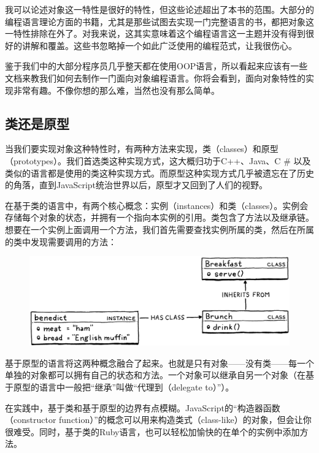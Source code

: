\documentclass[cn,10pt,math=newtx,citestyle=gb7714-2015,bibstyle=gb7714-2015]{elegantbook}
\begin{document}
我可以论述对象这一特性是很好的特性，但这些论述超出了本书的范围。大部分的编程语言理论方面的书籍，尤其是那些试图去实现一门完整语言的书，都把对象这一特性排除在外了。对我来说，这其实意味着这个编程语言这一主题并没有得到很好的讲解和覆盖。这些书忽略掉一个如此广泛使用的编程范式，让我很伤心。

鉴于我们中的大部分程序员几乎整天都在使用OOP语言，所以看起来应该有一些文档来教我们如何去制作一门面向对象编程语言。你将会看到，面向对象特性的实现非常有趣。不像你想的那么难，当然也没有那么简单。

\subsection{类还是原型}

当我们要实现对象这种特性时，有两种方法来实现，类（classes）和原型（prototypes）。我们首选类这种实现方式，这大概归功于C++、Java、C \# 以及类似的语言都是使用的类这种实现方式。而原型这种实现方式几乎被遗忘在了历史的角落，直到JavaScript统治世界以后，原型才又回到了人们的视野。

在基于类的语言中，有两个核心概念：实例（instances）和类（classes）。实例会存储每个对象的状态，并拥有一个指向本实例的引用。类包含了方法以及继承链。想要在一个实例上面调用一个方法，我们首先需要查找实例所属的类，然后在所属的类中发现需要调用的方法：

\begin{figure}[h]
\centering
\includegraphics[width=\textwidth]{./image/the-lox-language/class-lookup.png}
\end{figure}

基于原型的语言将这两种概念融合了起来。也就是只有对象——没有类——每一个单独的对象都可以拥有自己的状态和方法。一个对象可以继承自另一个对象（在基于原型的语言中一般把“继承”叫做“代理到（delegate to）”）。

\begin{tcolorbox}
在实践中，基于类和基于原型的边界有点模糊。JavaScript的“构造器函数（constructor function）”的概念可以用来构造类式（class-like）的对象，但会让你很难受。同时，基于类的Ruby语言，也可以轻松加愉快的在单个的实例中添加方法。
\end{tcolorbox}
\end{document}
